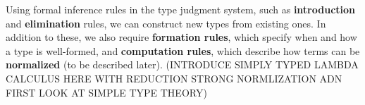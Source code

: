 Using formal inference rules in the type judgment system, such as \textbf{introduction} and \textbf{elimination}
rules, we can construct new types from existing ones. In addition to these,
we also require \textbf{formation rules}, which specify when and how a type is well-formed,
and \textbf{computation rules}, which describe how terms can be \textbf{normalized} (to be described later).
(INTRODUCE SIMPLY TYPED LAMBDA CALCULUS HERE WITH REDUCTION STRONG NORMLIZATION ADN FIRST LOOK AT SIMPLE TYPE THEORY)
